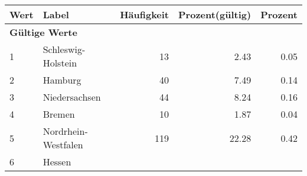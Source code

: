      \begin{longtable}{lXrrr}
     \toprule
     \textbf{Wert} & \textbf{Label} & \textbf{Häufigkeit} & \textbf{Prozent(gültig)} & \textbf{Prozent} \\
     \endhead
     \midrule
     \multicolumn{5}{l}{\textbf{Gültige Werte}}\\

     1 &
     \multicolumn{1}{X}{ Schleswig-Holstein   } &


       \num{13} &
       \num[round-mode=places,round-precision=2]{2.43} &
         \num[round-mode=places,round-precision=2]{0.05} \\

     2 &
     \multicolumn{1}{X}{ Hamburg   } &


       \num{40} &
       \num[round-mode=places,round-precision=2]{7.49} &
         \num[round-mode=places,round-precision=2]{0.14} \\

     3 &
     \multicolumn{1}{X}{ Niedersachsen   } &


       \num{44} &
       \num[round-mode=places,round-precision=2]{8.24} &
         \num[round-mode=places,round-precision=2]{0.16} \\

     4 &
     \multicolumn{1}{X}{ Bremen   } &


       \num{10} &
       \num[round-mode=places,round-precision=2]{1.87} &
         \num[round-mode=places,round-precision=2]{0.04} \\

     5 &
     \multicolumn{1}{X}{ Nordrhein-Westfalen   } &


       \num{119} &
       \num[round-mode=places,round-precision=2]{22.28} &
         \num[round-mode=places,round-precision=2]{0.42} \\

     6 &
     \multicolumn{1}{X}{ Hessen   } &



\end{longtable}
